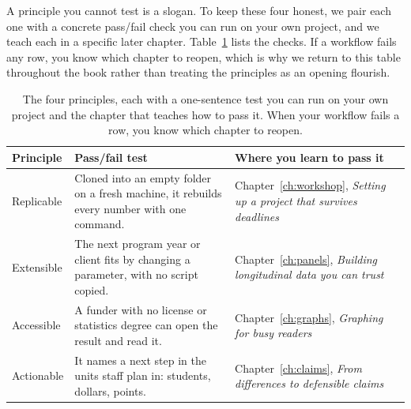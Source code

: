 \documentclass[
    a4paper,
    fontsize=10pt,
    twoside=true,
    numbers=noenddot,
]{kaobook}
\begin{document}
A principle you cannot test is a slogan. To keep these four honest, we pair each one with a concrete pass\slash fail check you can run on your own project, and we teach each in a specific later chapter. Table~\ref{tab:principles} lists the checks. If a workflow fails any row, you know which chapter to reopen, which is why we return to this table throughout the book rather than treating the principles as an opening flourish.

\begin{table}[htbp]
\centering
\footnotesize
\caption[The four principles, with pass/fail tests]{The four principles, each with a one-sentence test you can run on your own project and the chapter that teaches how to pass it. When your workflow fails a row, you know which chapter to reopen.}
\label{tab:principles}
\begin{tabular}{@{}p{2.0cm}p{8.4cm}p{4.6cm}@{}}
\hline
\textbf{Principle} & \textbf{Pass/fail test} & \textbf{Where you learn to pass it} \\
\hline
Replicable & Cloned into an empty folder on a fresh machine, it rebuilds every number with one command. & Chapter~\ref{ch:workshop}, \emph{Setting up a project that survives deadlines} \\
Extensible & The next program year or client fits by changing a parameter, with no script copied. & Chapter~\ref{ch:panels}, \emph{Building longitudinal data you can trust} \\
Accessible & A funder with no license or statistics degree can open the result and read it. & Chapter~\ref{ch:graphs}, \emph{Graphing for busy readers} \\
Actionable & It names a next step in the units staff plan in: students, dollars, points. & Chapter~\ref{ch:claims}, \emph{From differences to defensible claims} \\
\hline
\end{tabular}
\end{table}
\end{document}
